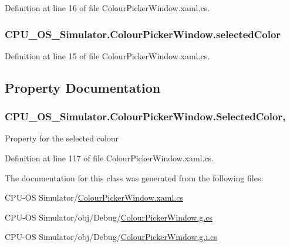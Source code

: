 Definition at line 16 of file Colour\+Picker\+Window.\+xaml.\+cs.

\hypertarget{class_c_p_u___o_s___simulator_1_1_colour_picker_window_a1c1653bebad209bd313da5a18ecea9bc}{}
\subsubsection[{selected\+Color}]{ C\+P\+U\+\_\+\+O\+S\+\_\+\+Simulator.\+Colour\+Picker\+Window.\+selected\+Color\hspace{0.3cm}{\ttfamily [private]}}\label{class_c_p_u___o_s___simulator_1_1_colour_picker_window_a1c1653bebad209bd313da5a18ecea9bc}


Definition at line 15 of file Colour\+Picker\+Window.\+xaml.\+cs.



\subsection{Property Documentation}
\hypertarget{class_c_p_u___o_s___simulator_1_1_colour_picker_window_a4e51070f2e58d178bf773acb4200e76e}{}
\subsubsection[{Selected\+Color}]{ C\+P\+U\+\_\+\+O\+S\+\_\+\+Simulator.\+Colour\+Picker\+Window.\+Selected\+Color\hspace{0.3cm}{\ttfamily [get]}, {\ttfamily [set]}}\label{class_c_p_u___o_s___simulator_1_1_colour_picker_window_a4e51070f2e58d178bf773acb4200e76e}


Property for the selected colour 



Definition at line 117 of file Colour\+Picker\+Window.\+xaml.\+cs.



The documentation for this class was generated from the following files\+:\begin{DoxyCompactItemize}
\item 
C\+P\+U-\/\+O\+S Simulator/\hyperlink{_colour_picker_window_8xaml_8cs}{Colour\+Picker\+Window.\+xaml.\+cs}\item 
C\+P\+U-\/\+O\+S Simulator/obj/\+Debug/\hyperlink{_colour_picker_window_8g_8cs}{Colour\+Picker\+Window.\+g.\+cs}\item 
C\+P\+U-\/\+O\+S Simulator/obj/\+Debug/\hyperlink{_colour_picker_window_8g_8i_8cs}{Colour\+Picker\+Window.\+g.\+i.\+cs}\end{DoxyCompactItemize}

